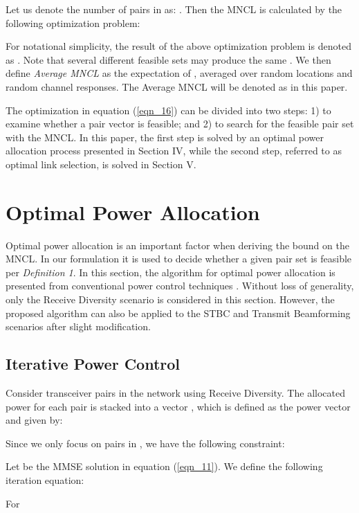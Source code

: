 \documentclass[draftcls,onecolumn,peerview,12pt]{IEEEtran}
\begin{document}
Let us denote the number of pairs in  as: . Then the
MNCL is calculated by the following optimization problem:



For notational simplicity, the result of the above optimization
problem is denoted as . Note that several different
feasible sets  may produce the same . We then
define \textit{Average MNCL} as the expectation of ,
averaged over random locations and random channel responses. The
Average MNCL will be denoted as  in this paper.

The optimization in equation (\ref{eqn_16}) can be divided into two
steps: 1) to examine whether a pair vector  is feasible; and 2)
to search for the feasible pair set  with the MNCL. In this
paper, the first step is solved by an optimal power allocation
process presented in Section IV, while the second step, referred to
as optimal link selection, is solved in Section V.

\section{Optimal Power Allocation}
Optimal power allocation is an important factor when deriving the
bound on the MNCL. In our formulation it is used to decide whether a
given pair set  is feasible per \textit{Definition 1}. In this
section, the algorithm for optimal power allocation is presented
from conventional power control techniques
\cite{13_JointOptimal1998, 22_Powercontrol1995,
23_FrameworkUplink1995}. Without loss of generality, only the  Receive Diversity scenario is considered in this section.
However, the proposed algorithm can also be applied to the  STBC and  Transmit Beamforming scenarios after slight
modification.

\subsection{Iterative Power Control}
Consider  transceiver pairs in the network using 
Receive Diversity. The allocated power for each pair is stacked into
a vector , which is defined as the power vector and
given by:


Since we only focus on pairs in , we have the following
constraint:


Let  be the MMSE solution in equation
(\ref{eqn_11}). We define the following iteration equation:

For 
\end{document}
